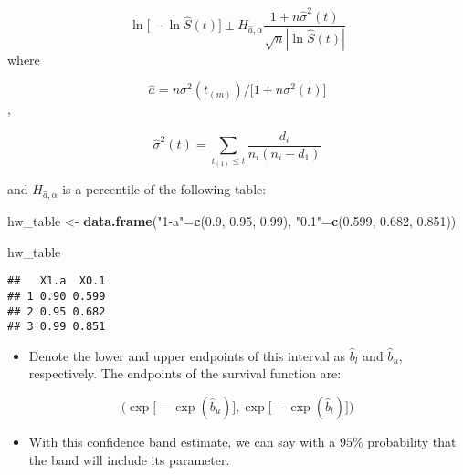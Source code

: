 \documentclass[]{article}
\newenvironment{Shaded}{\begin{snugshade}}{\end{snugshade}}
\newcommand{\FloatTok}[1]{\textcolor[rgb]{0.00,0.00,0.81}{#1}}
\newcommand{\KeywordTok}[1]{\textcolor[rgb]{0.13,0.29,0.53}{\textbf{#1}}}
\newcommand{\NormalTok}[1]{#1}
\newcommand{\StringTok}[1]{\textcolor[rgb]{0.31,0.60,0.02}{#1}}
\providecommand{\tightlist}{%
  \setlength{\itemsep}{0pt}\setlength{\parskip}{0pt}}
\begin{document}
\[\ln\big[-\ln\hat{S}(t)\big] \pm H_{\hat{a},\alpha} \frac{1+n\hat{\sigma}^2(t)}{\sqrt{n}|\ln\hat{S}(t)|}\]
where

\[\hat{a} = n{\sigma}^2(t_{(m)}) / \big[1+n{\sigma}^2(t)\big]\],

\[\hat{\sigma}^2(t) = \sum\limits_{t_{(1)} \leq t} \frac{d_i}{n_i(n_i-d_1)}\]

and \(H_{\hat{a},\alpha}\) is a percentile of the following table:

\begin{Shaded}
\begin{Highlighting}[]
\NormalTok{hw_table <-}\StringTok{ }\KeywordTok{data.frame}\NormalTok{(}\StringTok{"1-a"}\NormalTok{=}\KeywordTok{c}\NormalTok{(}\FloatTok{0.9}\NormalTok{, }\FloatTok{0.95}\NormalTok{, }\FloatTok{0.99}\NormalTok{),}
                       \StringTok{"0.1"}\NormalTok{=}\KeywordTok{c}\NormalTok{(}\FloatTok{0.599}\NormalTok{, }\FloatTok{0.682}\NormalTok{, }\FloatTok{0.851}\NormalTok{))}

\NormalTok{hw_table}
\end{Highlighting}
\end{Shaded}

\begin{verbatim}
##   X1.a  X0.1
## 1 0.90 0.599
## 2 0.95 0.682
## 3 0.99 0.851
\end{verbatim}

\begin{itemize}
\tightlist
\item
  Denote the lower and upper endpoints of this interval as \(\hat{b}_l\)
  and \(\hat{b}_u\), respectively. The endpoints of the survival
  function are:
\end{itemize}

\[\Big(\exp\big[-\exp(\hat{b}_u)\big], \exp\big[-\exp(\hat{b}_l)\big]\Big)\]

\begin{itemize}
\tightlist
\item
  With this confidence band estimate, we can say with a \(95\%\)
  probability that the band will include its parameter.
\end{itemize}
\end{document}
